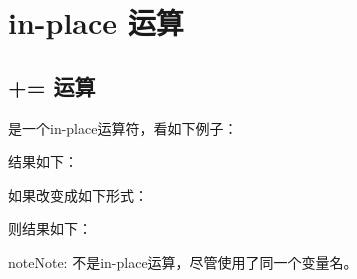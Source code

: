 \documentclass[letterpaper,10pt,english]{sphinxmanual}
\begin{document}
\section{in-place 运算}
\label{\detokenize{python/01_inplace:in-place}}\label{\detokenize{python/01_inplace::doc}}

\subsection{+= 运算}
\label{\detokenize{python/01_inplace:id1}}
\sphinxcode{\sphinxupquote{+=}} 是一个in-place运算符，看如下例子：

%
\begin{sphinxVerbatim}[commandchars=\\\{\},numbers=left,firstnumber=1,stepnumber=1]
  \PYG{p}{[}\PYG{p}{]}
  
  \PYG{p}{[}\PYG{p}{]}
\end{sphinxVerbatim}

结果如下：

%
\begin{sphinxVerbatim}[commandchars=\\\{\}]
 
 
\end{sphinxVerbatim}

如果改变成如下形式：

%
\begin{sphinxVerbatim}[commandchars=\\\{\},numbers=left,firstnumber=1,stepnumber=1]
  \PYG{p}{[}\PYG{p}{]}
  
    \PYG{p}{[}\PYG{p}{]}
\end{sphinxVerbatim}

则结果如下：

%
\begin{sphinxVerbatim}[commandchars=\\\{\}]
 
 
\end{sphinxVerbatim}

\begin{sphinxadmonition}{note}{Note:}
 不是in-place运算，尽管使用了同一个变量名。
\end{sphinxadmonition}
\end{document}
